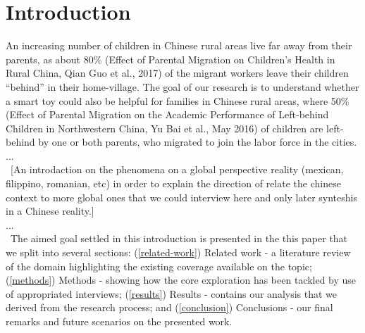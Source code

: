 \section{Introduction}


An increasing number of children in Chinese rural areas live far away from their parents, as about 80\% (Effect of Parental Migration on Children’s Health in Rural China, Qian Guo et al., 2017) of the migrant workers leave their children “behind” in their home-village. The goal of our research is to understand whether a smart toy could also be helpful for families in Chinese rural areas, where 50\% (Effect of Parental Migration on the Academic Performance of Left-behind Children in Northwestern China, Yu Bai et al., May 2016) of children are left-behind by one or both parents, who migrated to join the labor force in the cities.\\
...\\\
[An introdaction on the phenomena on a global perspective reality (mexican, filippino, romanian, etc) in order to explain the direction of relate the chinese context to more global ones that we could interview here and only later synteshis in a Chinese reality.]\\
...\\\
The aimed goal settled in this introduction is presented in the this paper that we split into several sections: (\ref{related-work}) Related work - a literature review of the domain highlighting the existing coverage available on the topic; (\ref{methods}) Methods - showing how the core exploration has been tackled by use of appropriated interviews; (\ref{results}) Results - contains our analysis that we derived from the research process; and (\ref{conclusion}) Conclusions - our final remarks and future scenarios on the presented work.


